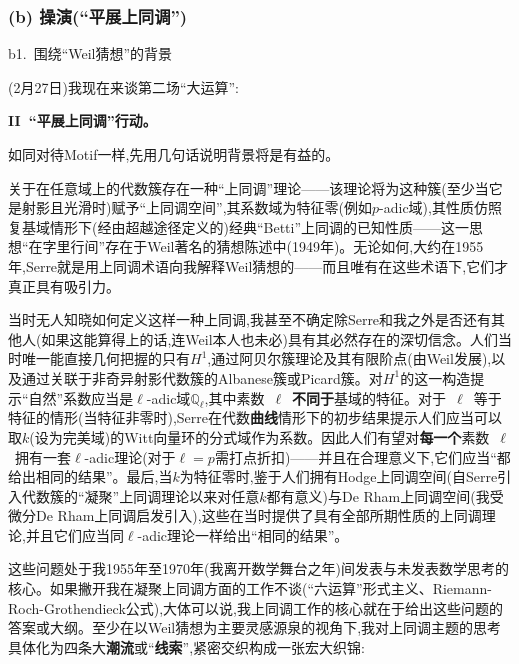 \subsubsection*{(b) 操演(“平展上同调”)}

b1.~围绕“Weil猜想”的背景


\dmark{}(2月27日)我现在来谈第二场“大运算”:

\textbf{II~“平展上同调”行动。}

如同对待Motif一样,先用几句话说明背景将是有益的。

关于在任意域上的代数簇存在一种“上同调”理论——该理论将为这种簇(至少当它是射影且光滑时)赋予“上同调空间”,其系数域为特征零(例如$p$-adic域),其性质仿照复基域情形下(经由超越途径定义的)经典“Betti”上同调的已知性质——这一思想“在字里行间”存在于Weil著名的猜想陈述中(1949年)。无论如何,大约在1955年,Serre就是用上同调术语向我解释Weil猜想的——而且唯有在这些术语下,它们才真正具有吸引力。

当时无人知晓如何定义这样一种上同调,我甚至不确定除Serre和我之外是否还有其他人(如果这能算得上的话,连Weil本人也未必)具有其必然存在的深切信念。人们当时唯一能直接几何把握的只有$H^1$,通过阿贝尔簇理论及其有限阶点(由Weil发展),以及通过关联于非奇异射影代数簇的Albanese簇或Picard簇。对$H^1$的这一构造提示“自然”系数应当是$\ell$-adic域$\mathbb{Q}_\ell$,其中素数~$\ell$~\textbf{不同于}基域的特征。对于~$\ell$~等于特征的情形(当特征非零时),Serre在代数\textbf{曲线}情形下的初步结果提示人们应当可以取$k$(设为完美域)的Witt向量环的分式域作为系数。因此人们有望对\textbf{每一个}素数~$\ell$~拥有一套$\ell$-adic理论(对于$\ell=p$需打点折扣)——并且在合理意义下,它们应当“都给出相同的结果”。最后,当$k$为特征零时,鉴于人们拥有Hodge上同调空间(自Serre引入代数簇的“凝聚”上同调理论以来对任意$k$都有意义)与De Rham上同调空间(我受微分De Rham上同调启发引入),这些在当时提供了具有全部所期\dmark{}性质的上同调理论,并且它们应当同$\ell$-adic理论一样给出“相同的结果”。

这些问题处于我1955年至1970年(我离开数学舞台之年)间发表与未发表数学思考的核心。如果撇开我在凝聚上同调方面的工作不谈(“六运算”形式主义、Riemann-Roch-Grothendieck公式),大体可以说,我上同调工作的核心就在于给出这些问题的答案或大纲。至少在以Weil猜想为主要灵感源泉的视角下,我对上同调主题的思考具体化为四条大\textbf{潮流}或“\textbf{线索}”,紧密交织构成一张宏大织锦:

